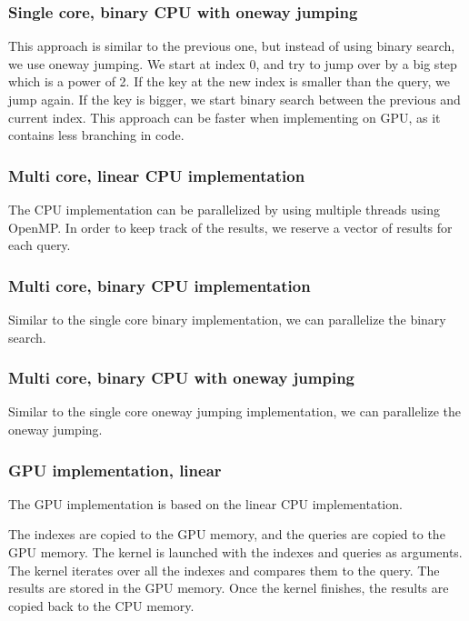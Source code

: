 \documentclass[a4paper,12pt]{article}
\begin{document}
    \subsubsection{Single core, binary CPU with oneway jumping}

    This approach is similar to the previous one, but instead of using binary search, we use oneway jumping.
    We start at index 0, and try to jump over by a big step which is a power of 2.
    If the key at the new index is smaller than the query, we jump again.
    If the key is bigger, we start binary search between the previous and current index.
    This approach can be faster when implementing on GPU, as it contains less branching in code.

    \subsubsection{Multi core, linear CPU implementation}

    The CPU implementation can be parallelized by using multiple threads using OpenMP.
    In order to keep track of the results, we reserve a vector of results for each query.

    \subsubsection{Multi core, binary CPU implementation}

    Similar to the single core binary implementation, we can parallelize the binary search.

    \subsubsection{Multi core, binary CPU with oneway jumping}

    Similar to the single core oneway jumping implementation, we can parallelize the oneway jumping.

    \subsubsection{GPU implementation, linear}

    The GPU implementation is based on the linear CPU implementation.

    The indexes are copied to the GPU memory, and the queries are copied to the GPU memory.
    The kernel is launched with the indexes and queries as arguments.
    The kernel iterates over all the indexes and compares them to the query.
    The results are stored in the GPU memory.
    Once the kernel finishes, the results are copied back to the CPU memory.
\end{document}
